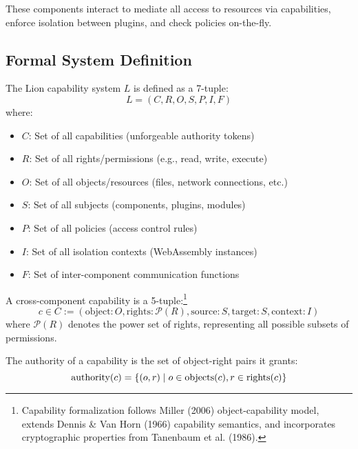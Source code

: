 These components interact to mediate all access to resources via capabilities, enforce isolation between plugins, and check policies on-the-fly.

\subsection{Formal System Definition}

\begin{definition}
The Lion capability system $L$ is defined as a 7-tuple:
\begin{equation}
L = (C, R, O, S, P, I, F)
\end{equation}
where:
\begin{itemize}
\item $C$: Set of all capabilities (unforgeable authority tokens)
\item $R$: Set of all rights/permissions (e.g., read, write, execute)
\item $O$: Set of all objects/resources (files, network connections, etc.)
\item $S$: Set of all subjects (components, plugins, modules)
\item $P$: Set of all policies (access control rules)
\item $I$: Set of all isolation contexts (WebAssembly instances)
\item $F$: Set of inter-component communication functions
\end{itemize}
\end{definition}

\begin{definition}
A cross-component capability is a 5-tuple:\footnote{Capability formalization follows Miller (2006) object-capability model, extends Dennis \& Van Horn (1966) capability semantics, and incorporates cryptographic properties from Tanenbaum et al. (1986).}
\begin{equation}
c \in C := (\text{object}: O, \text{rights}: \mathcal{P}(R), \text{source}: S, \text{target}: S, \text{context}: I)
\end{equation}
where $\mathcal{P}(R)$ denotes the power set of rights, representing all possible subsets of permissions.
\end{definition}

\begin{definition}
The authority of a capability is the set of object-right pairs it grants:
\begin{equation}
\text{authority}(c) = \{(o, r) \mid o \in \text{objects}(c), r \in \text{rights}(c)\}
\end{equation}
\end{definition}

